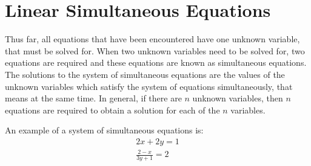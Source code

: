 \documentclass[10pt,a4paper,titlepage,twoside,openright]{report}
\begin{document}


\section{Linear Simultaneous Equations}

Thus far, all equations that have been encountered have one unknown variable, that must be solved for. When two unknown variables need to be solved for, two equations are required and these equations are known as simultaneous equations. The solutions to the system of simultaneous equations are the values of the unknown variables which satisfy the system of equations simultaneously, that means at the same time. In general, if there are $n$ unknown variables, then $n$ equations are required to obtain a solution for each of the $n$ variables.

An example of a system of simultaneous equations is:
\begin{eqnarray}
\label{sim:example}
2x+2y=1\\
\frac{2-x}{3y+1}=2 \nonumber
\end{eqnarray}
\end{document}
